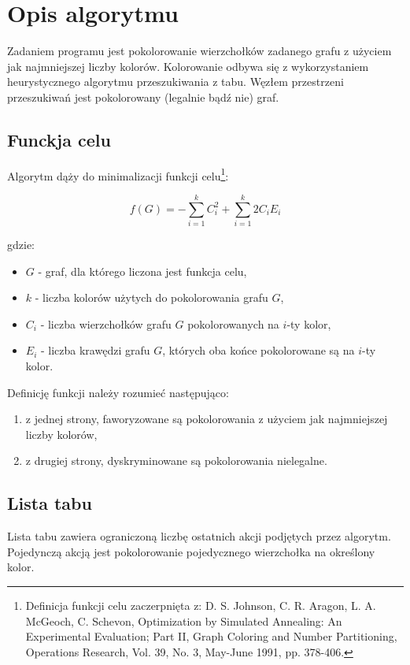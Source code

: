 \section{Opis algorytmu}
Zadaniem programu jest pokolorowanie wierzchołków zadanego grafu z użyciem jak najmniejszej liczby kolorów.
Kolorowanie odbywa się z wykorzystaniem heurystycznego algorytmu przeszukiwania z tabu.
Węzłem przestrzeni przeszukiwań jest pokolorowany (legalnie bądź nie) graf.

\subsection{Funckja celu}
Algorytm dąży do minimalizacji funkcji celu\footnote{Definicja funkcji celu zaczerpnięta z: D. S. Johnson, C. R. Aragon, L. A. McGeoch, C. Schevon, Optimization by Simulated Annealing: An Experimental Evaluation; Part II, Graph Coloring and Number Partitioning, Operations Research, Vol. 39, No. 3, May-June 1991, pp. 378-406.}:

\begin{equation}
 f(G) = -\sum_{i=1}^{k} C_i^2 + \sum_{i=1}^{k} 2 C_i E_i
\end{equation}

gdzie:
\begin{itemize}
 \item $G$ - graf, dla którego liczona jest funkcja celu,
 \item $k$ - liczba kolorów użytych do pokolorowania grafu $G$,
 \item $C_i$ - liczba wierzchołków grafu $G$ pokolorowanych na $i$-ty kolor,
 \item $E_i$ - liczba krawędzi grafu $G$, których oba końce pokolorowane są na $i$-ty kolor.
\end{itemize}

Definicję funkcji należy rozumieć następująco:

\begin{enumerate}
 \item z jednej strony, faworyzowane są pokolorowania z użyciem jak najmniejszej liczby kolorów,
 \item z drugiej strony, dyskryminowane są pokolorowania nielegalne.
\end{enumerate}

\subsection{Lista tabu}
Lista tabu zawiera ograniczoną liczbę ostatnich akcji podjętych przez algorytm.
Pojedynczą akcją jest pokolorowanie pojedycznego wierzchołka na określony kolor.